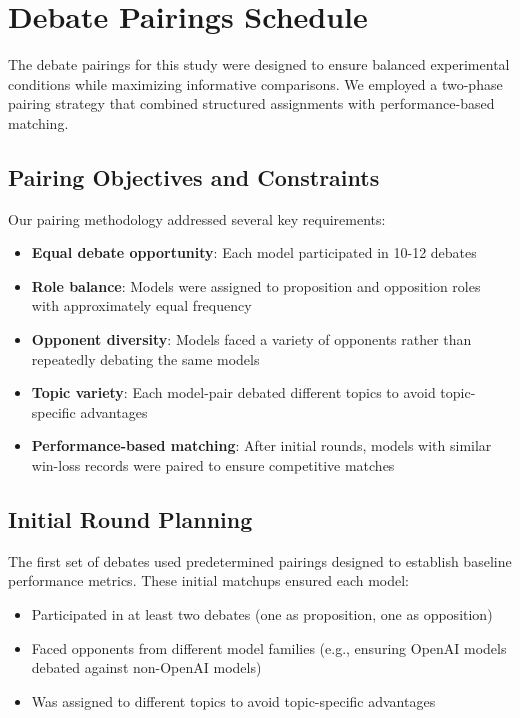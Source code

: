 \documentclass{article}
\begin{document}
  \section{Debate Pairings Schedule}
\label{appendix:pairings}
The debate pairings for this study were designed to ensure balanced experimental conditions while maximizing informative comparisons. We employed a two-phase pairing strategy that combined structured assignments with performance-based matching.


\subsection{Pairing Objectives and Constraints}
Our pairing methodology addressed several key requirements:
\begin{itemize}
\item \textbf{Equal debate opportunity}: Each model participated in 10-12 debates
\item \textbf{Role balance}: Models were assigned to proposition and opposition roles with approximately equal frequency
\item \textbf{Opponent diversity}: Models faced a variety of opponents rather than repeatedly debating the same models
\item \textbf{Topic variety}: Each model-pair debated different topics to avoid topic-specific advantages
\item \textbf{Performance-based matching}: After initial rounds, models with similar win-loss records were paired to ensure competitive matches
\end{itemize}
\subsection{Initial Round Planning}
The first set of debates used predetermined pairings designed to establish baseline performance metrics. These initial matchups ensured each model:
\begin{itemize}
\item Participated in at least two debates (one as proposition, one as opposition)
\item Faced opponents from different model families (e.g., ensuring OpenAI models debated against non-OpenAI models)
\item Was assigned to different topics to avoid topic-specific advantages
\end{itemize}
\end{document}
